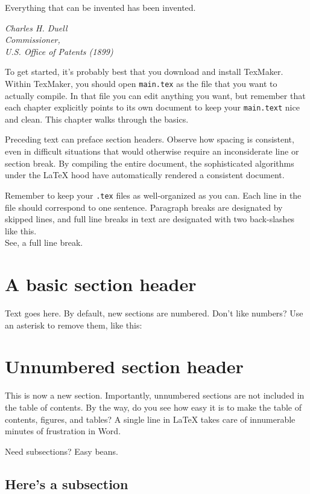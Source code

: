 \singlespacing
\epigraph{Everything that can be invented has been invented.}{\textit{Charles H. Duell\\ Commissioner, \\ U.S. Office of Patents (1899)}} 
\doublespace

To get started, it's probably best that you download and install TexMaker.
Within TexMaker, you should open \texttt{main.tex} as the file that you want to actually compile.
In that file you can edit anything you want, but remember that each chapter explicitly points to its own document to keep your \texttt{main.text} nice and clean. 
This chapter walks through the basics. 

Preceding text can preface section headers.
Observe how spacing is consistent, even in difficult situations that would otherwise require an inconsiderate line or section break.
By compiling the entire document, the sophisticated algorithms under the LaTeX hood have automatically rendered a consistent document.

Remember to keep your \texttt{.tex} files as well-organized as you can.
Each line in the file should correspond to one sentence.
Paragraph breaks are designated by skipped lines, and full line breaks in text are designated with two back-slashes like this.\\

See, a full line break.


\section{A basic section header}

Text goes here. 
By default, new sections are numbered. 
Don't like numbers? 
Use an asterisk to remove them, like this:

\section*{Unnumbered section header}

This is now a new section. 
Importantly, unnumbered sections are not included in the table of contents.
By the way, do you see how easy it is to make the table of contents, figures, and tables?
A single line in LaTeX takes care of innumerable minutes of frustration in Word.

Need subsections? 
Easy beans.

\subsection{Here's a subsection}


